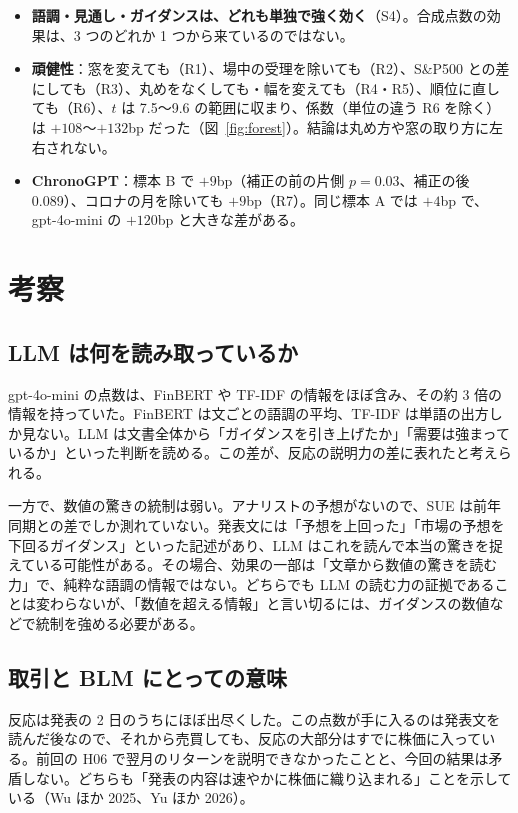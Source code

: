 \documentclass[xelatex,ja=standard,jafont=haranoaji,a4paper,10pt,openany]{bxjsreport}
\newcommand{\figref}[1]{図~\ref{#1}}
\begin{document}
\begin{itemize}
\item \textbf{語調・見通し・ガイダンスは、どれも単独で強く効く}（S4）。合成点数の効果は、3 つのどれか 1 つから来ているのではない。
\item \textbf{頑健性}：窓を変えても（R1）、場中の受理を除いても（R2）、S\&P500 との差にしても（R3）、丸めをなくしても・幅を変えても（R4・R5）、順位に直しても（R6）、$t$ は 7.5〜9.6 の範囲に収まり、係数（単位の違う R6 を除く）は $+108$〜$+132$bp だった（\figref{fig:forest}）。結論は丸め方や窓の取り方に左右されない。
\item \textbf{ChronoGPT}：標本 B で $+9$bp（補正の前の片側 $p=0.03$、補正の後 0.089）、コロナの月を除いても $+9$bp（R7）。同じ標本 A では $+4$bp で、gpt-4o-mini の $+120$bp と大きな差がある。
\end{itemize}

\chapter{考察}\label{ch:discussion}

\section{LLM は何を読み取っているか}

gpt-4o-mini の点数は、FinBERT や TF-IDF の情報をほぼ含み、その約 3 倍の情報を持っていた。FinBERT は文ごとの語調の平均、TF-IDF は単語の出方しか見ない。LLM は文書全体から「ガイダンスを引き上げたか」「需要は強まっているか」といった判断を読める。この差が、反応の説明力の差に表れたと考えられる。

一方で、数値の驚きの統制は弱い。アナリストの予想がないので、SUE は前年同期との差でしか測れていない。発表文には「予想を上回った」「市場の予想を下回るガイダンス」といった記述があり、LLM はこれを読んで本当の驚きを捉えている可能性がある。その場合、効果の一部は「文章から数値の驚きを読む力」で、純粋な語調の情報ではない。どちらでも LLM の読む力の証拠であることは変わらないが、「数値を超える情報」と言い切るには、ガイダンスの数値などで統制を強める必要がある。

\section{取引と BLM にとっての意味}

反応は発表の 2 日のうちにほぼ出尽くした。この点数が手に入るのは発表文を読んだ後なので、それから売買しても、反応の大部分はすでに株価に入っている。前回の H06 で翌月のリターンを説明できなかったことと、今回の結果は矛盾しない。どちらも「発表の内容は速やかに株価に織り込まれる」ことを示している（Wu ほか 2025、Yu ほか 2026）。
\end{document}
